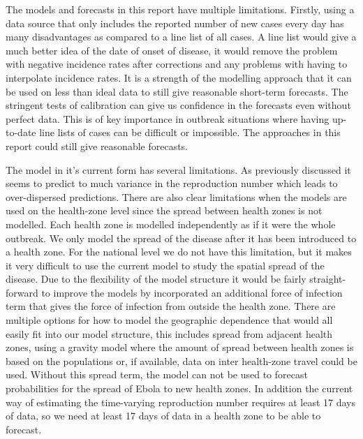 \documentclass[12pt]{article}
\begin{document}


The models and forecasts in this report have multiple limitations. Firstly, using a data source that only includes the reported number of new cases every day has many disadvantages as compared to a line list of all cases. A line list would give a much better idea of the date of onset of disease, it would remove the problem with negative incidence rates after corrections and any problems with having to interpolate incidence rates. It is a strength of the modelling approach that it can be used on less than ideal data to still give reasonable short-term forecasts. The stringent tests of calibration can give us confidence in the forecasts even without perfect data. This is of key importance in outbreak situations where having up-to-date line lists of cases can be difficult or impossible. The approaches in this report could still give reasonable forecasts. 

The model in it's current form has several limitations. As previously discussed it seems to predict to much variance in the reproduction number which leads to over-dispersed predictions. There are also clear limitations when the models are used on the health-zone level since the spread between health zones is not modelled. Each health zone is modelled independently as if it were the whole outbreak. We only model the spread of the disease after it has been introduced to a health zone. For the national level we do not have this limitation, but it makes it very difficult to use the current model to study the spatial spread of the disease. Due to the flexibility of the model structure it would be fairly straight-forward to improve the models by incorporated an additional force of infection term that gives the force of infection from outside the health zone. There are multiple options for how to model the geographic dependence that would all easily fit into our model structure, this includes spread from adjacent health zones, using a gravity model where the amount of spread between health zones is based on the populations \cite{haynesGravitySpatialInteraction1985} or, if available, data on inter health-zone travel could be used. Without this spread term, the model can not be used to forecast probabilities for the spread of Ebola to new health zones. In addition the current way of estimating the time-varying reproduction number requires at least 17 days of data, so we need at least 17 days of data in a health zone to be able to forecast.
\end{document}
